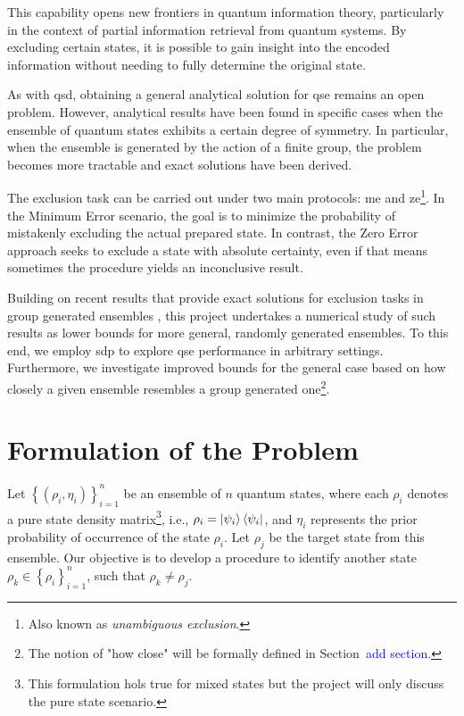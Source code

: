 \documentclass[12pt,letterpaper]{article}
\begin{document}
\begin{multicols}{2}
This capability opens new frontiers in quantum information theory, particularly in the context of partial information retrieval from quantum systems. By excluding certain states, it is possible to gain insight into the encoded information without needing to fully determine the original state.

As with \gls{qsd}, obtaining a general analytical solution for \gls{qse} remains an open problem. However, analytical results have been found in specific cases when the ensemble of quantum states exhibits a certain degree of symmetry. In particular, when the ensemble is generated by the action of a finite group, the problem becomes more tractable and exact solutions have been derived.

The exclusion task can be carried out under two main protocols: \gls{me} and \gls{ze}\footnote{Also known as \emph{unambiguous exclusion}.}. In the Minimum Error scenario, the goal is to minimize the probability of mistakenly excluding the actual prepared state. In contrast, the Zero Error approach seeks to exclude a state with absolute certainty, even if that means sometimes the procedure yields an inconclusive result.

Building on recent results that provide exact solutions for exclusion tasks in group generated ensembles \cite{MainPaper}, this project undertakes a numerical study of such results as lower bounds for more general, randomly generated ensembles. To this end, we employ \gls{sdp} to explore \gls{qse} performance in arbitrary settings. Furthermore, we investigate improved bounds for the general case based on how closely a given ensemble resembles a group generated one\footnote{The notion of "how close" will be formally defined in Section~\textcolor{blue}{add section}.}.

\section{Formulation of the Problem}

Let $\left\{(\rho_i, \eta_i)\right\}_{i=1}^n$ be an ensemble of $n$ quantum states, where each $\rho_i$ denotes a pure state density matrix\footnote{This formulation hols true for mixed states but the project will only discuss the pure state scenario.}, i.e., $\rho_i = \ket{\psi_i}\bra{\psi_i}$, and $\eta_i$ represents the prior probability of occurrence of the state $\rho_i$. Let $\rho_j$ be the target state from this ensemble. Our objective is to develop a procedure to identify another state $\rho_k \in \left\{\rho_i\right\}_{i=1}^n$, such that $\rho_k \neq \rho_j$.


\end{multicols}
\end{document}
